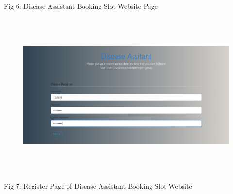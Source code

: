 \documentclass[12pt]{article}
\begin{document}
\vspace{\baselineskip}\begin{Center}
Fig 6: Disease Assistant Booking Slot Website Page
\end{Center}

\vspace{\baselineskip}
\setlength{\parskip}{9.96pt}



\begin{figure}[H]
	\begin{Center}
		\includegraphics[width=6.49in,height=3.31in]{./media/image13.png}
	\end{Center}
\end{figure}



\setlength{\parskip}{12.0pt}

\vspace{\baselineskip}\begin{Center}
Fig 7: Register Page of Disease Assistant Booking Slot Website
\end{Center}

\vspace{\baselineskip}
\setlength{\parskip}{9.96pt}

\vspace{\baselineskip}
\setlength{\parskip}{12.0pt}
\setlength{\parskip}{9.96pt}


\end{document}
